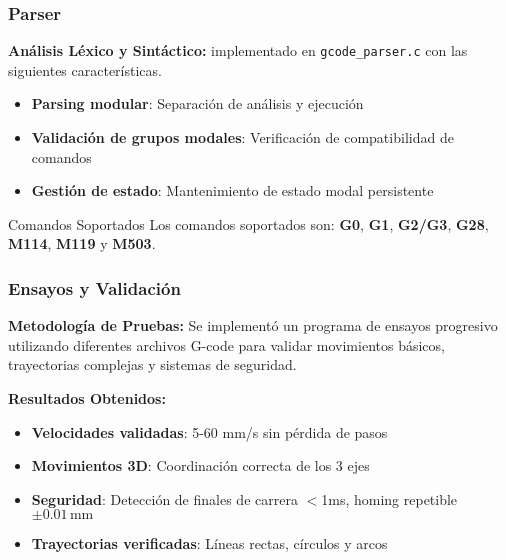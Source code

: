 \documentclass{beamer}
\begin{document}
\begin{frame}
    \frametitle{Parser}
\textbf{Análisis Léxico y Sintáctico:} implementado en \texttt{gcode\_parser.c} con las siguientes características.

\begin{itemize}
    \item \textbf{Parsing modular}: Separación de análisis y ejecución
    \item \textbf{Validación de grupos modales}: Verificación de compatibilidad de comandos
    \item \textbf{Gestión de estado}: Mantenimiento de estado modal persistente
\end{itemize}

\begin{block}{Comandos Soportados}
Los comandos soportados son: \textbf{G0}, \textbf{G1}, \textbf{G2/G3}, \textbf{G28}, \textbf{M114}, \textbf{M119} y \textbf{M503}.
\end{block}
\end{frame}

\begin{frame}
    \frametitle{Ensayos y Validación}

\textbf{Metodología de Pruebas:}
Se implementó un programa de ensayos progresivo utilizando diferentes archivos G-code para validar movimientos básicos, trayectorias complejas y sistemas de seguridad.

\textbf{Resultados Obtenidos:}
\begin{itemize}
    \item \textbf{Velocidades validadas}: 5-60 mm/s sin pérdida de pasos
    \item \textbf{Movimientos 3D}: Coordinación correcta de los 3 ejes
    \item \textbf{Seguridad}: Detección de finales de carrera $<$1ms, homing repetible $\pm 0.01\,\mathrm{mm}$
    \item \textbf{Trayectorias verificadas}: Líneas rectas, círculos y arcos
\end{itemize}

\end{frame}
\end{document}
